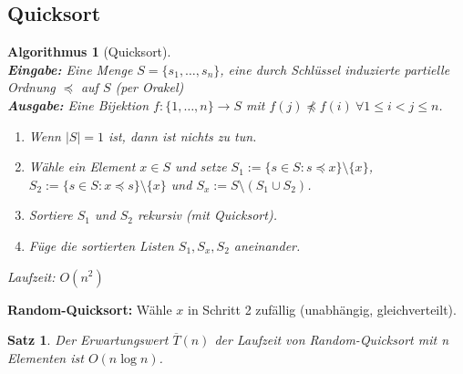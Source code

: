 \documentclass[12pt,a4paper]{article}
\theoremstyle{plain}
\newtheorem{Satz}[Theorem]{Satz}
\newtheorem{Algorithmus}[Theorem]{Algorithmus}
\numberwithin{equation}{section}
\begin{document}
\subsection{Quicksort}
\begin{Algorithmus}[Quicksort]\\
\textbf{Eingabe:} Eine Menge $S=\{s_1,\ldots,s_n\}$, eine durch Schlüssel induzierte partielle Ordnung $\preceq$ auf $S$ (per Orakel)\\
\textbf{Ausgabe:} Eine Bijektion $f:\{1,\ldots,n\} \rightarrow S$ mit $f(j)\not\preceq f(i)\ \forall 1\leq i < j \leq n$.
\begin{enumerate}
\item Wenn $|S|=1$ ist, dann ist nichts zu tun.
\item Wähle ein Element $x\in S$ und setze $S_1:=\{s\in S:s\preceq x\}\setminus \{x\}$, $S_2:=\{s\in S: x\preceq s\}\setminus\{x\}$ und $S_x:=S\setminus (S_1 \cup S_2)$.
\item Sortiere $S_1$ und $S_2$ rekursiv (mit Quicksort).
\item Füge die sortierten Listen $S_1,S_x,S_2$ aneinander.
\end{enumerate}
Laufzeit: $O(n^2)$
\end{Algorithmus}
\textbf{Random-Quicksort:} Wähle $x$ in Schritt 2 zufällig (unabhängig, gleichverteilt).
\begin{Satz} Der Erwartungswert $\overline{T}(n)$ der Laufzeit von Random-Quicksort mit n Elementen ist $O(n \log n)$.
\end{Satz}
\end{document}
